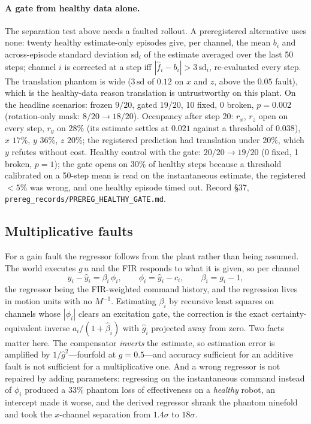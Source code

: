 \documentclass{article}
\newcommand{\code}[1]{\texttt{\small #1}}
\begin{document}
\paragraph{A gate from healthy data alone.} The separation test above needs a faulted rollout.
A preregistered alternative uses none: twenty healthy estimate-only episodes give, per channel,
the mean $b_i$ and across-episode standard deviation $\mathrm{sd}_i$ of the estimate averaged
over the last 50 steps; channel $i$ is corrected at a step iff $|\hat f_i-b_i|>3\,\mathrm{sd}_i$,
re-evaluated every step. The translation phantom is wide ($3\,\mathrm{sd}$ of $0.12$ on $x$ and
$z$, above the $0.05$ fault), which is the healthy-data reason translation is untrustworthy on
this plant. On the headline scenarios: frozen $9/20$, gated $19/20$, 10 fixed, 0 broken,
$p=0.002$ (rotation-only mask: $8/20\to18/20$). Occupancy after step 20: $r_x$, $r_z$ open on
every step, $r_y$ on $28\%$ (its estimate settles at $0.021$ against a threshold of $0.038$),
$x$ $17\%$, $y$ $36\%$, $z$ $20\%$; the registered prediction had translation under $20\%$,
which $y$ refutes without cost. Healthy control with the gate: $20/20\to19/20$ (0 fixed, 1
broken, $p=1$); the gate opens on $30\%$ of healthy steps because a threshold calibrated on a
50-step mean is read on the instantaneous estimate, the registered $<5\%$ was wrong, and one
healthy episode timed out. Record \S37, \code{prereg\_records/PREREG\_HEALTHY\_GATE.md}.

\subsection{Multiplicative faults}
\label{sec:gain}

For a gain fault the regressor follows from the plant rather than being assumed. The world
executes $g\,u$ and the FIR responds to what it is given, so per channel
\begin{equation}
y_i - \hat y_i = \beta_i\,\phi_i,\qquad \phi_i = \hat y_i - c_i,\qquad \beta_i = g_i - 1,
\end{equation}
the regressor being the FIR-weighted command history, and the regression lives in motion
units with no $M^{-1}$. Estimating $\beta_i$ by recursive least squares on channels whose
$|\phi_i|$ clears an excitation gate, the correction is the exact certainty-equivalent
inverse $a_i/(1+\hat\beta_i)$ with $\hat g_i$ projected away from zero. Two facts matter
here. The compensator \emph{inverts} the estimate, so estimation error is amplified by
$1/\hat g^2$---fourfold at $g=0.5$---and accuracy sufficient for an additive fault is not
sufficient for a multiplicative one. And a wrong regressor is not repaired by adding
parameters: regressing on the instantaneous command instead of $\phi_i$ produced a $33\%$
phantom loss of effectiveness on a \emph{healthy} robot, an intercept made it worse, and the
derived regressor shrank the phantom ninefold and took the $x$-channel separation from
$1.4\sigma$ to $18\sigma$.
\end{document}
